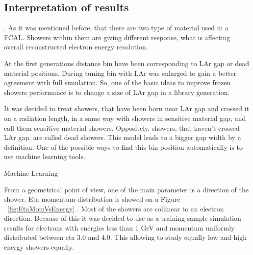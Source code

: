 \begin{figure}
\end{figure}


\begin{figure}
\end{figure}
\subsection{Interpretation of results}
.
As it was mentioned before, that there are two type of material used in a FCAL. Showers within them are giving different response, what is affecting overall reconstructed electron energy resolution.


  At the first generations distance bin have been corresponding to LAr gap or dead material positions. During tuning bin with LAr was enlarged to gain a better agreement with full simulation. So, one of the basic ideas to improve frozen showers performance is to change a size of LAr gap in a library generation. 

It was decided to treat showers, that have been born near LAr gap and crossed it on a radiation length, in a same way with showers in sensitive material gap, and call them sensitive material showers. Oppositely, showers, that haven't crossed LAr gap, are called dead showers. This model leads to a bigger gap width by a definition. One of the possible ways to find this bin position automatically is to use machine learning tools. 

Machine Learning

From a geometrical point of view, one of the main parameter is a direction of the shower. Eta momentum distribution is showed on a Figure ~\ref{fig:EtaMomVsEnergy} . Most of the showers are collinear to an electron direction. Because of this it was decided to use as a training sample simulation results for electrons with energies less than 1 GeV and momentum uniformly distributed between eta 3.0 and 4.0. This allowing to study equally low and high energy showers equally.

